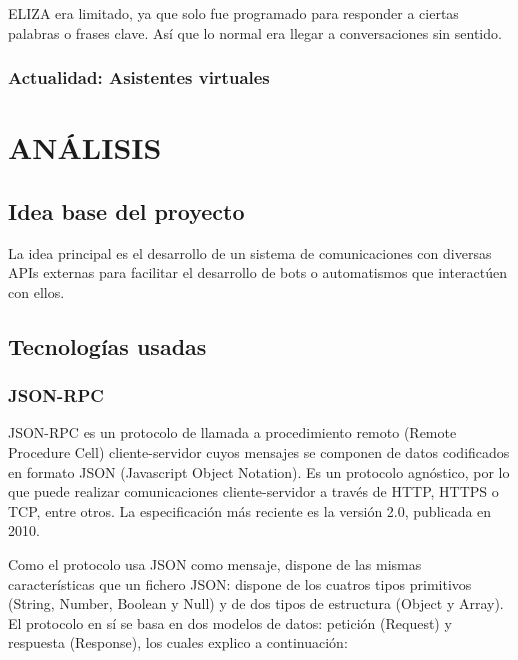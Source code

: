 \documentclass[spanish,12pt, a4paper, twoside]{paper}
\let\oldsection\section
\def\section{\cleardoublepage\oldsection}
\begin{document}
ELIZA era limitado, ya que solo fue programado para responder a ciertas palabras o frases clave. Así que lo normal era llegar a conversaciones sin sentido.


\subsubsection{Actualidad: Asistentes virtuales}

\section{ANÁLISIS}

\subsection{Idea base del proyecto}

La idea principal es el desarrollo de un sistema de comunicaciones con diversas APIs externas para facilitar el desarrollo de bots o automatismos que interactúen con ellos.

\subsection{Tecnologías usadas}

\subsubsection{JSON-RPC}

JSON-RPC es un protocolo de llamada a procedimiento remoto (Remote Procedure Cell) cliente-servidor cuyos mensajes se componen de datos codificados en formato JSON (Javascript Object Notation). Es un protocolo agnóstico, por lo que puede realizar comunicaciones cliente-servidor a través de HTTP, HTTPS o TCP, entre otros. La especificación más reciente es la versión 2.0, publicada en 2010.

Como el protocolo usa JSON como mensaje, dispone de las mismas características que un fichero JSON: dispone de los cuatros tipos primitivos (String, Number, Boolean y Null) y de dos tipos de estructura (Object y Array).
El protocolo en sí se basa en dos modelos de datos: petición (Request) y respuesta (Response), los cuales explico a continuación:
\end{document}
